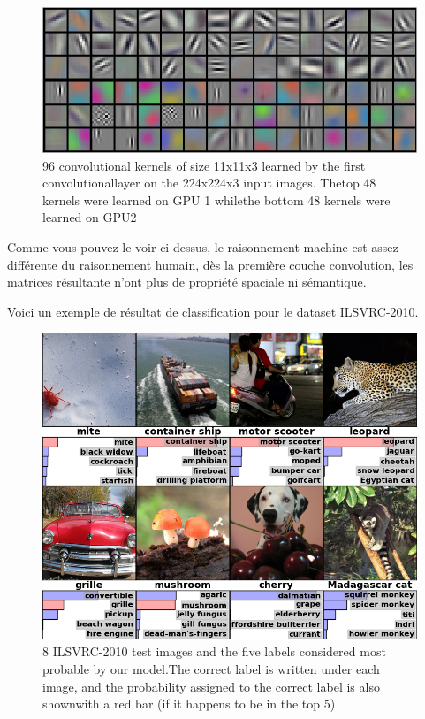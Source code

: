 \documentclass[12pt, letterpaper]{article}
\begin{document}
\begin{figure}[H]
    \includegraphics[width=\linewidth]{img/fig10.png}
    \caption{96 convolutional kernels of size 11x11x3 learned by the first convolutionallayer on the 224x224x3 input images. Thetop 48 kernels were learned on GPU 1 whilethe bottom 48 kernels were learned on GPU2}
    \label{fig:L9}
\end{figure}

Comme vous pouvez le voir ci-dessus, le raisonnement machine est assez différente du raisonnement humain, dès la première couche convolution, les matrices résultante n'ont plus 
de propriété spaciale ni sémantique. 

Voici un exemple de résultat de classification pour le dataset ILSVRC-2010.

\begin{figure}[H]
    \includegraphics[width=\linewidth]{img/fig11.png}
    \caption{8 ILSVRC-2010 test images and the five labels considered most probable by our model.The correct label is written under each image, and the probability assigned to the correct label is also shownwith a red bar (if it happens to be in the top 5)}
    \label{fig:L10}
\end{figure}
\end{document}
